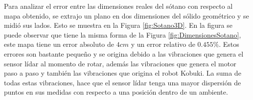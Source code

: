 Para analizar el error entre las dimensiones reales del sótano con respecto al mapa 
obtenido, se extrajo un plano en dos dimensiones del sólido geométrico y se midió sus 
lados. Esto se muestra en la Figura \ref{fig:Sotano3D}. En la figura se puede observar
que tiene la misma forma de la Figura \ref{fig:DimensionesSotano}, este mapa tiene un 
error absoluto de $4 cm$ y un error relativo de $0.455 \%$. Estos errores son bastante 
pequeño y se origina debido a las vibraciones que genera el sensor lídar al momento de 
rotar, además las vibraciones que genera el motor paso a paso y también las vibraciones 
que origina el robot Kobuki. La suma de todas estas vibraciones, hace que el sensor 
lídar tenga una mayor dispersión de puntos en sus medidas con respecto a una posición
dentro de un ambiente. 



 
